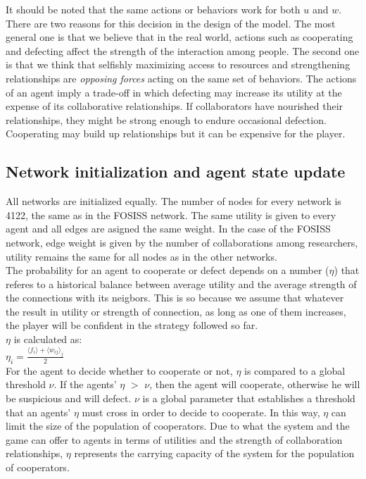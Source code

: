\documentclass[11pt]{article}
\begin{document}
{\color{red} It should be noted that the same actions or behaviors work for
  both $u$ and $w$. There are two reasons for this decision in the design of the
model. The most general one is that we believe that in the real world,
actions such as cooperating and defecting affect the strength of the interaction
among people. The second one is that we think that selfishly maximizing access to resources and
strengthening relationships are \emph{opposing forces} acting on the same set of
behaviors. The actions of an agent imply a trade-off in which defecting may
increase its utility at the expense of its collaborative relationships. If
collaborators have nourished their relationships, they might be strong enough to
endure occasional defection. Cooperating may build up relationships but it can be
expensive for the player.}

\subsection{Network initialization and agent state update}

All networks are initialized equally. The number of nodes for every network is 4122, the same as in the FOSISS network.
The same utility is given to every agent and all edges are asigned the same weight. In the case of the FOSISS
network, edge weight is given by the number of collaborations among researchers, utility remains the same for all nodes as in
the other networks.\\

The probability for an agent to cooperate or defect depends on a
number ($\eta$) that referes to a historical balance between average utility and
the average strength of the connections with its neigbors.   {\color{red} This is so
  because we assume that whatever the result in utility or strength of
  connection, as long as one of them increases, the player will be confident in
  the strategy followed so far}.\\ 


$\eta$ is calculated as:\\ 


$\eta_i = \frac{\langle f_i \rangle + \langle w_{ij} \rangle _j}{2}$\\

{\color{red} For the agent to decide whether to cooperate or not, $\eta$ is
  compared to a global threshold $\nu$. If the agents' $\eta$ $>$ $\nu$,
  then the agent will cooperate, otherwise he will be suspicious and will
  defect. $\nu$ is a global parameter that establishes a threshold that an
  agents' $\eta$ must cross in order to decide to cooperate. In this way,
  $\eta$ can limit the size of the population of cooperators. Due
  to what the system and the game can offer to agents in terms of utilities and the strength
  of collaboration relationships, $\eta$ represents the carrying capacity of the
  system for the population of cooperators}.  
\end{document}
